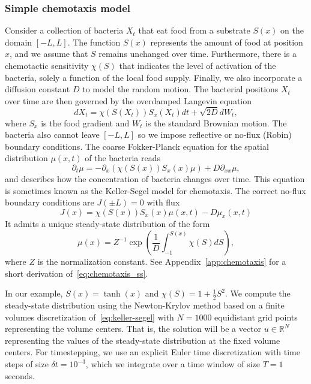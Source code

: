 \documentclass{article}
\begin{document}
\subsubsection{Simple chemotaxis model} \label{subsubsec:chemotaxis}
Consider a collection of bacteria $X_t$ that eat food from a substrate $S(x)$ on the domain $[-L,L]$. The function $S(x)$ represents the amount of food at position $x$, and we assume that $S$ remains unchanged over time. Furthermore, there is a chemotactic sensitivity $\chi(S)$ that indicates the level of activation of the bacteria, solely a function of the local food supply. Finally, we also incorporate a diffusion constant $D$ to model the random motion. The bacterial positions $X_t$ over time are then governed by the overdamped Langevin equation
\begin{equation} \label{eq:chemotaxis}
 dX_t = \chi(S(X_t)) S_x(X_t)dt + \sqrt{2D} dW_t,
\end{equation}
where $S_x$ is the food gradient and $W_t$ is the standard Brownian motion. The bacteria also cannot leave $[-L,L]$ so we impose reflective or no-flux (Robin) boundary conditions. The coarse Fokker-Planck equation for the spatial distribution $\mu(x,t)$ of the bacteria reads 
\begin{equation} \label{eq:keller-segel}
 \partial_t \mu = -\partial_x(\chi(S(x))S_x(x)\mu) + D\partial_{xx}\mu,
\end{equation}
and describes how the concentration of bacteria changes over time. This equation is sometimes known as the Keller-Segel model for chemotaxis. The correct no-flux boundary conditions are $J(\pm L) = 0$ with flux
\[
J(x) = \chi(S(x))S_x(x)\mu(x,t) - D \mu_x(x,t)
\]
It admits a unique steady-state distribution of the form
\begin{equation} \label{eq:chemotaxis_ss}
 \mu(x) = Z^{-1}\exp\left(\frac{1}{D}\int^{S(x)}_{-1} \chi(S) dS\right),
\end{equation}
where $Z$ is the normalization constant. See Appendix~\ref{app:chemotaxis} for a short derivation of~\eqref{eq:chemotaxis_ss}.

In our example, $S(x) = \tanh(x)$ and $\chi(S) = 1 + \frac{1}{2}S^2$. We compute the steady-state distribution using the Newton-Krylov method based on a finite volumes discretization of~\eqref{eq:keller-segel} with $N=1000$ equidistant grid points representing the volume centers. That is, the solution will be a vector $u \in \mathbb{R}^N$ representing the values of the steady-state distribution at the fixed volume centers. For timestepping, we use an explicit Euler time discretization with time steps of size $\delta t = 10^{-3}$, which we integrate over a time window of size $T = 1$ seconds. 
\end{document}
